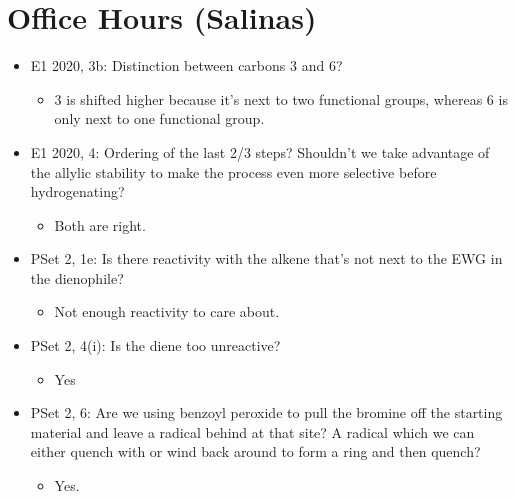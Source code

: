 \documentclass[../notes.tex]{subfiles}
\begin{document}
\section{Office Hours (Salinas)}
\begin{itemize}
    \item E1 2020, 3b: Distinction between carbons 3 and 6?
    \begin{itemize}
        \item 3 is shifted higher because it's next to two functional groups, whereas 6 is only next to one functional group.
    \end{itemize}
    \item E1 2020, 4: Ordering of the last 2/3 steps? Shouldn't we take advantage of the allylic stability to make the process even more selective before hydrogenating?
    \begin{itemize}
        \item Both are right.
    \end{itemize}
    \item PSet 2, 1e: Is there reactivity with the alkene that's not next to the EWG in the dienophile?
    \begin{itemize}
        \item Not enough reactivity to care about.
    \end{itemize}
    \item PSet 2, 4(i): Is the diene too unreactive?
    \begin{itemize}
        \item Yes
    \end{itemize}
    \item PSet 2, 6: Are we using benzoyl peroxide to pull the bromine off the starting material and leave a radical behind at that site? A radical which we can either quench with  or wind back around to form a ring and then quench?
    \begin{itemize}
        \item Yes.
    \end{itemize}
\end{itemize}
\end{document}
